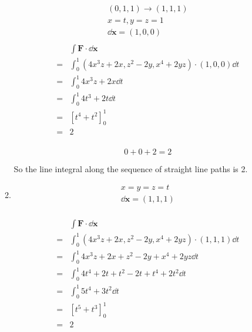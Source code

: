\documentclass[10pt,\jkfside,a4paper]{article}
\begin{document}
\begin{enumerate}
\begin{enumerate}[label=(\roman*)]
\begin{equation*}
\begin{split}
(0, 1, 1) \longrightarrow (1, 1, 1) \\
x = t, y = z = 1 \\
\dd{\mathbf{x}} = (1, 0, 0) \\
\end{split}
\end{equation*}
\begin{equation}
\begin{split}
 & \int \mathbf{F} \cdot \dd{\mathbf{x}} \\
=& \int^1_0 (4x^3z + 2x, z^2 - 2y, x^4 + 2yz) \cdot (1, 0, 0) \dd{t} \\
=& \int^1_0 4x^3z + 2x \dd{t} \\
=& \int^1_0 4t^3 + 2t \dd{t} \\
=& [t^4 + t^2]^1_0 \\
=& 2 \\
\end{split}
\end{equation}

\begin{equation}
0 + 0 + 2 = 2
\end{equation}

So the line integral along the sequence of straight line paths is 2.

\item 

\begin{equation}
\begin{split}
x = y = z = t \\
\dd{\mathbf{x}} = (1, 1, 1) \\
\end{split}
\end{equation}

\begin{equation}
\begin{split}
 & \int \mathbf{F}\cdot \dd{\mathbf{x}} \\
=& \int^1_0 (4x^3z + 2x, z^2 - 2y, x^4 + 2yz) \cdot (1, 1, 1) \dd{t} \\
=& \int^1_0 4x^3z + 2x + z^2 - 2y + x^4 + 2yz\dd{t} \\
=& \int^1_0 4t^4 + 2t + t^2 - 2t + t^4 + 2t^2\dd{t} \\
=& \int^1_0 5t^4 + 3t^2\dd{t} \\
=& [t^5 + t^3]^1_0 \\
=& 2 \\
\end{split}
\end{equation}


\end{enumerate}
\end{enumerate}
\end{document}
